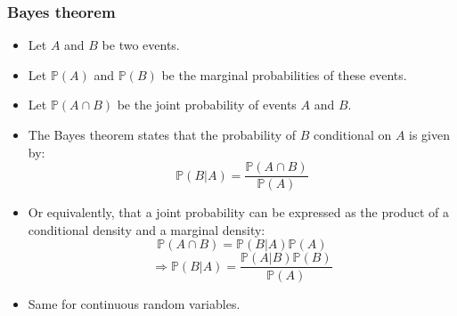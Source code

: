 \documentclass[10pt,slidestop]{beamer}
\begin{document}
\begin{frame}
  \frametitle{Bayes theorem}

  \begin{itemize}

  \item Let $A$ and $B$ be two events.

    \bigskip

  \item Let $\mathbb P(A)$ and  $\mathbb P(B)$ be the marginal
    probabilities of these events.

    \bigskip

  \item Let $\mathbb P(A \cap B)$ be the joint probability of events $A$
    and $B$.

    \bigskip

  \item The Bayes theorem states that the probability of $B$
    conditional on $A$ is given by:
    \[
    \mathbb P(B|A) = \frac{\mathbb P(A \cap B)}{\mathbb P(A)}
    \]

    \bigskip

  \item Or equivalently, that a joint probability can be expressed as
    the product of a conditional density and a marginal density:
    \[
    \mathbb P(A \cap B) = \mathbb P(B|A)\mathbb P(A)
    \]
    \[
    \Rightarrow \mathbb P(B|A) = \frac{\mathbb P(A|B)\mathbb P(B)}{\mathbb P(A)}
    \]

    \bigskip

  \item Same for continuous random variables.

  \end{itemize}

   \end{frame}
\end{document}
